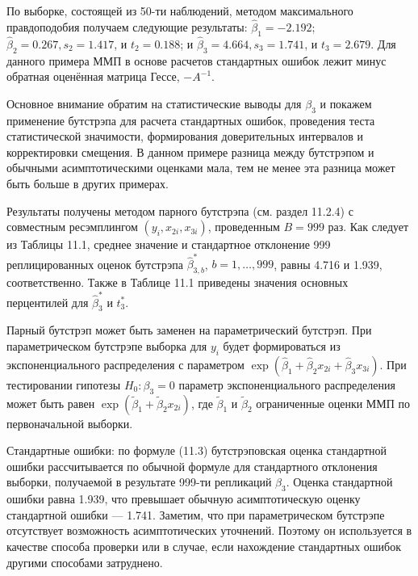 По выборке, состоящей из 50-ти наблюдений, методом максимального правдоподобия получаем следующие результаты: $\hat{\beta}_1=-2.192$; $\hat{\beta}_2=0.267,s_2=1.417$, и $t_2=0.188$; и $\hat{\beta}_3=4.664, s_3=1.741$, и $t_3=2.679$. Для данного примера ММП в основе расчетов стандартных ошибок лежит минус обратная оценённая матрица Гессе, $-A^{-1}$.

Основное внимание обратим на статистические выводы для $\beta_3$ и покажем применение бутстрэпа для расчета стандартных ошибок, проведения теста статистической значимости, формирования доверительных интервалов и корректировки смещения. В данном примере разница между бутстрэпом и обычными асимптотическими оценками мала, тем не менее эта разница может быть больше в других примерах.

Результаты получены методом парного бутстрэпа (см. раздел 11.2.4) с совместным ресэмплингом $(y_i,x_{2i},x_{3i})$, проведенным $B=999$ раз. Как следует из Таблицы 11.1, среднее значение и стандартное отклонение 999 реплицированных оценок бутстрэпа $\hat{\beta}_{3,b}^*$, $b=1,\ldots ,999$, равны 4.716 и 1.939, соответственно. Также в Таблице 11.1 приведены значения основных перцентилей для $\hat{\beta}_3^*$ и $t_3^*$.

Парный бутстрэп может быть заменен на параметрический бутстрэп. При параметрическом бутстрэпе выборка для $y_i$ будет формироваться из экспоненциального распределения с параметром $\exp(\hat{\beta}_1+\hat{\beta}_{2}x_{2i}+\hat{\beta}_{3}x_{3i})$. При тестировании гипотезы $H_0:\beta_3=0$ параметр экспоненциального распределения может быть равен $\exp(\tilde{\beta}_1+\tilde{\beta}_2x_{2i})$, где $\tilde{\beta}_1$ и $\tilde{\beta}_2$ ограниченные оценки ММП по первоначальной выборки.

Стандартные ошибки: по формуле (11.3) бутстрэповская оценка стандартной ошибки  рассчитывается по обычной формуле для  стандартного отклонения выборки, получаемой в результате 999-ти репликаций $\beta_3$. Оценка стандартной ошибки равна 1.939, что превышает обычную асимптотическую оценку стандартной ошибки --- 1.741. Заметим, что при параметрическом бутстрэпе отсутствует возможность асимптотических уточнений. Поэтому он используется в качестве способа проверки или в случае, если нахождение стандартных ошибок другими способами  затруднено.

